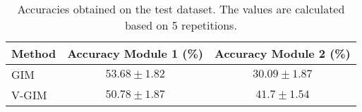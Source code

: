 		\begin{table}
	\centering
	\renewcommand{\arraystretch}{1.2} %
	\begin{tabular}{|l|c|c|}
		\hline
		\textbf{Method} & \textbf{Accuracy Module 1 (\%)} & \textbf{Accuracy Module 2 (\%)} \\ \hline
		GIM         	& $53.68 \pm 1.82$	& $30.09 \pm 1.87$             \\ \hline
		V-GIM         	& $50.78 \pm 1.87$ 	& $41.7 \pm 1.54$             \\ \hline
	\end{tabular}
	\caption{Accuracies obtained on the test dataset. The values are calculated based on 5 repetitions.}
	\label{tab:classifier_accuracies}
\end{table}


